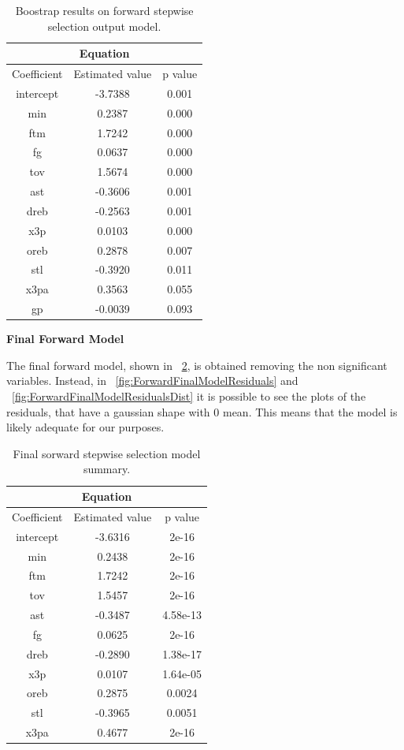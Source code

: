 \begin{table}[h]
	\centering
	\begin{tabular}{||c | c | c ||} 
		\hline
		\multicolumn{3}{|c|}{Equation} \\
		\hline
		Coefficient & Estimated value & p value \\
		\hline
		intercept & -3.7388 & 0.001 \\
		min & 0.2387 & 0.000 \\
		ftm & 1.7242 & 0.000 \\
		fg & 0.0637 & 0.000 \\
		tov & 1.5674 & 0.000 \\
		ast & -0.3606 & 0.001 \\
		dreb & -0.2563 & 0.001 \\
		x3p & 0.0103 & 0.000 \\
		oreb & 0.2878 & 0.007 \\
		stl & -0.3920 & 0.011 \\
		x3pa & 0.3563 & 0.055 \\
		gp & -0.0039 & 0.093 \\
		\hline
	\end{tabular}
	\caption{Boostrap results on forward stepwise selection output model.}
	\label{table:BootForwardModel}
\end{table}

\vspace{0.2cm}
\noindent
\textbf{Final Forward Model}

The final forward model, shown in \Fig~\ref{table:ForwardFinalModelSummary}, is obtained removing the non significant variables. Instead, in \Fig~\ref{fig:ForwardFinalModelResiduals} and \Fig~\ref{fig:ForwardFinalModelResidualsDist} it is possible to see the plots of the residuals, that have a gaussian shape with 0 mean. This means that the model is likely adequate for our purposes.

\begin{table}[h]
	\centering
	\begin{tabular}{||c | c | c ||} 
		\hline
		\multicolumn{3}{|c|}{Equation} \\
		\hline
		Coefficient & Estimated value & p value \\
		\hline
		intercept & -3.6316 & 2e-16 \\
		min & 0.2438 & 2e-16 \\
		ftm & 1.7242 & 2e-16 \\
		tov & 1.5457 & 2e-16 \\
		ast & -0.3487 & 4.58e-13 \\
		fg & 0.0625 & 2e-16 \\
		dreb & -0.2890 & 1.38e-17 \\
		x3p & 0.0107 & 1.64e-05 \\
		oreb & 0.2875 & 0.0024 \\
		stl & -0.3965 & 0.0051 \\
		x3pa & 0.4677 & 2e-16 \\
		\hline
	\end{tabular}
	\caption{Final sorward stepwise selection model summary.}
	\label{table:ForwardFinalModelSummary}
\end{table}

